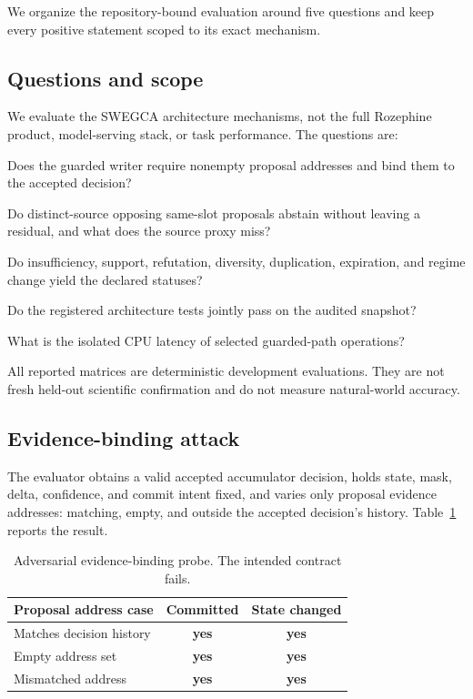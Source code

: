 \documentclass[10pt]{article}
\newcommand{\swegca}{\textsc{SWEGCA}}
\newcommand{\yes}{\textbf{yes}}
\begin{document}
We organize the repository-bound evaluation around five questions and keep every positive statement scoped to its exact mechanism.

\subsection{Questions and scope}

We evaluate the \swegca{} architecture mechanisms, not the full Rozephine product, model-serving stack, or task performance. The questions are:
\begin{description}[leftmargin=1.35in,style=nextline]
  \item[RQ1: Evidence binding.] Does the guarded writer require nonempty proposal addresses and bind them to the accepted decision?
  \item[RQ2: Arbitration.] Do distinct-source opposing same-slot proposals abstain without leaving a residual, and what does the source proxy miss?
  \item[RQ3: Accumulation.] Do insufficiency, support, refutation, diversity, duplication, expiration, and regime change yield the declared statuses?
  \item[RQ4: Regression.] Do the registered architecture tests jointly pass on the audited snapshot?
  \item[RQ5: Mechanism cost.] What is the isolated CPU latency of selected guarded-path operations?
\end{description}

All reported matrices are deterministic development evaluations. They are not fresh held-out scientific confirmation and do not measure natural-world accuracy.

\subsection{Evidence-binding attack}

The evaluator obtains a valid accepted accumulator decision, holds state, mask, delta, confidence, and commit intent fixed, and varies only proposal evidence addresses: matching, empty, and outside the accepted decision's history. Table~\ref{tab:binding} reports the result.

\begin{table}[!htbp]
\centering
\small
\begin{tabular}{@{}lcc@{}}
\toprule
Proposal address case & Committed & State changed \\
\midrule
Matches decision history & \yes & \yes \\
Empty address set & \yes & \yes \\
Mismatched address & \yes & \yes \\
\bottomrule
\end{tabular}
\caption{Adversarial evidence-binding probe. The intended contract fails.}
\label{tab:binding}
\end{table}
\end{document}
